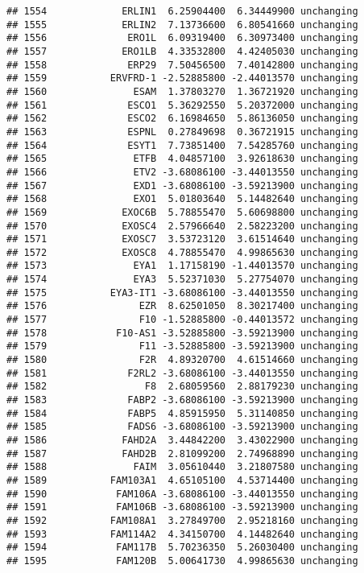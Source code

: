 \documentclass[]{article}
\begin{document}
\begin{verbatim}
## 1554             ERLIN1  6.25904400  6.34449900 unchanging
## 1555             ERLIN2  7.13736600  6.80541660 unchanging
## 1556              ERO1L  6.09319400  6.30973400 unchanging
## 1557             ERO1LB  4.33532800  4.42405030 unchanging
## 1558              ERP29  7.50456500  7.40142800 unchanging
## 1559           ERVFRD-1 -2.52885800 -2.44013570 unchanging
## 1560               ESAM  1.37803270  1.36721920 unchanging
## 1561              ESCO1  5.36292550  5.20372000 unchanging
## 1562              ESCO2  6.16984650  5.86136050 unchanging
## 1563              ESPNL  0.27849698  0.36721915 unchanging
## 1564              ESYT1  7.73851400  7.54285760 unchanging
## 1565               ETFB  4.04857100  3.92618630 unchanging
## 1566               ETV2 -3.68086100 -3.44013550 unchanging
## 1567               EXD1 -3.68086100 -3.59213900 unchanging
## 1568               EXO1  5.01803640  5.14482640 unchanging
## 1569             EXOC6B  5.78855470  5.60698800 unchanging
## 1570             EXOSC4  2.57966640  2.58223200 unchanging
## 1571             EXOSC7  3.53723120  3.61514640 unchanging
## 1572             EXOSC8  4.78855470  4.99865630 unchanging
## 1573               EYA1  1.17158190 -1.44013570 unchanging
## 1574               EYA3  5.52371030  5.27754070 unchanging
## 1575           EYA3-IT1 -3.68086100 -3.44013550 unchanging
## 1576                EZR  8.62501050  8.30217400 unchanging
## 1577                F10 -1.52885800 -0.44013572 unchanging
## 1578            F10-AS1 -3.52885800 -3.59213900 unchanging
## 1579                F11 -3.52885800 -3.59213900 unchanging
## 1580                F2R  4.89320700  4.61514660 unchanging
## 1581              F2RL2 -3.68086100 -3.44013550 unchanging
## 1582                 F8  2.68059560  2.88179230 unchanging
## 1583              FABP2 -3.68086100 -3.59213900 unchanging
## 1584              FABP5  4.85915950  5.31140850 unchanging
## 1585              FADS6 -3.68086100 -3.59213900 unchanging
## 1586             FAHD2A  3.44842200  3.43022900 unchanging
## 1587             FAHD2B  2.81099200  2.74968890 unchanging
## 1588               FAIM  3.05610440  3.21807580 unchanging
## 1589           FAM103A1  4.65105100  4.53714400 unchanging
## 1590            FAM106A -3.68086100 -3.44013550 unchanging
## 1591            FAM106B -3.68086100 -3.59213900 unchanging
## 1592           FAM108A1  3.27849700  2.95218160 unchanging
## 1593           FAM114A2  4.34150700  4.14482640 unchanging
## 1594            FAM117B  5.70236350  5.26030400 unchanging
## 1595            FAM120B  5.00641730  4.99865630 unchanging

\end{verbatim}
\end{document}
